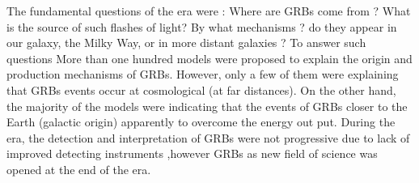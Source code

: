 The fundamental questions of the era were : Where are GRBs come from ?   What is the source of such flashes of light? By what mechanisms ? do they appear in our galaxy, the Milky Way, or in more distant galaxies ? To answer such questions More than one hundred models were proposed to explain the origin and  production mechanisms of GRBs. However, only a few of them were explaining  that GRBs events occur at cosmological (at far distances). On the other hand, the majority of the models were indicating that the events of GRBs closer to the Earth (galactic origin) apparently to overcome the energy out put. During the era, the detection and interpretation of GRBs were not progressive due to lack of improved detecting instruments ,however  GRBs as new field of science was opened at the end of the era\citep{4}\citep{6}. \\\\
